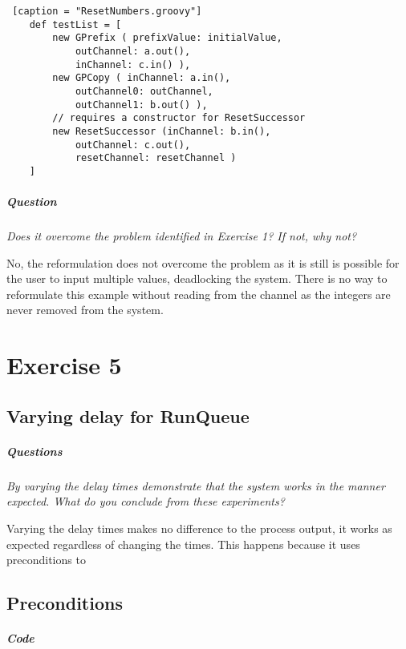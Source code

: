 \documentclass[10pt, a4paper]{article}
\begin{document}
	\begin{lstlisting} [caption = "ResetNumbers.groovy"]
	def testList = [
		new GPrefix ( prefixValue: initialValue, 
			outChannel: a.out(), 
			inChannel: c.in() ),
		new GPCopy ( inChannel: a.in(), 
			outChannel0: outChannel, 
			outChannel1: b.out() ),
		// requires a constructor for ResetSuccessor
		new ResetSuccessor (inChannel: b.in(),
			outChannel: c.out(),
			resetChannel: resetChannel )
	]	\end{lstlisting}
	
	\subparagraph{Question}
	
	\hfill
	
	\textit{Does it overcome the problem identified in Exercise 1? If not, why not?}
	
	No, the reformulation does not overcome the problem as it is still is possible for the user to input multiple values, deadlocking the system. There is no way to reformulate this example without reading from the channel as the integers are never removed from the system.
	
	\setcounter{section}{5}
	\section*{Exercise 5}
	
	\setcounter{subsection}{0}
	\subsection{Varying delay for RunQueue}
	
	\subparagraph{Questions}
	\textit{By varying the delay times demonstrate that the system works in the manner expected. What do you conclude from these experiments?}
	
	Varying the delay times makes no difference to the process output, it works as expected regardless of changing the times. This happens because it uses preconditions to 
	
	
	\subsection{Preconditions}
	
	\subparagraph{Code} \hfill
	
\end{document}
